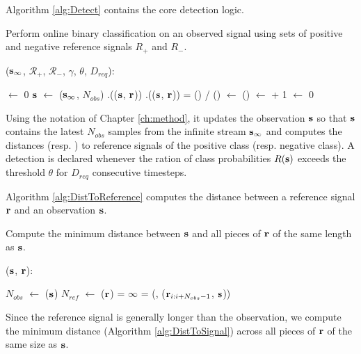 Algorithm \ref{alg:Detect} contains the core detection logic. 
\begin{algorithm}
\caption{Perform online binary classification on an observed signal
    using sets of positive and negative reference signals $R_+$ and $R_-$.}
\label{alg:Detect}
($\mathbf s_{\infty}$, $\mathcal{R}_+$, $\mathcal{R}_-$, $\gamma$, $\theta$,
$D_{req}$):
\begin{algorithmic}[1]
\STATE {} $\leftarrow$ 0
\LOOP
  \STATE $\mathbf s$ $\leftarrow$ ($\mathbf s_{\infty}$, $N_{obs}$)
    \STATE {}.(($\mathbf s$, $\mathbf r$))
  \ENDFOR
    \STATE {}.(($\mathbf s$, $\mathbf r$))
  \ENDFOR
  \STATE {} = () / ()
      \STATE {} $\leftarrow$ ()
      \RETURN {}
    \ELSE
      \STATE {} $\leftarrow$  + 1
    \ENDIF
  \ELSE
    \STATE {} $\leftarrow$ 0
  \ENDIF
\ENDLOOP
\end{algorithmic}
\end{algorithm}
Using the notation of Chapter \ref{ch:method}, it updates the observation $\mathbf
s$ so that $\mathbf s$ contains the latest $N_{obs}$ samples from the infinite
stream $\mathbf s_{\infty}$ and computes the distances 
(resp. ) to reference signals of the positive class (resp. negative
class). A detection is declared whenever the ration of class probabilities
$R(\mathbf s)$ exceeds the threshold $\theta$ for $D_{req}$ consecutive timesteps.

Algorithm \ref{alg:DistToReference} computes the distance between a reference
signal $\mathbf r$ and an observation $\mathbf s$. 
\begin{algorithm}
\caption{Compute the minimum distance between $\mathbf s$ and all pieces of $\mathbf r$
  of the same length as $\mathbf s$.}
\label{alg:DistToReference}
($\mathbf s$, $\mathbf r$):
\begin{algorithmic}[1]
  \STATE $N_{obs}$ $\leftarrow$ ($\mathbf s$)
  \STATE $N_{ref}$ $\leftarrow$ ($\mathbf r$)
  \STATE {} = $\infty$
    \STATE {} = (, ($\mathbf r_{i:i+N_{obs}-1}$, $\mathbf s$))
  \ENDFOR
  \RETURN {}
\end{algorithmic}
\end{algorithm}
Since the reference signal is
generally longer than the observation, we compute the minimum distance
(Algorithm \ref{alg:DistToSignal}) across all pieces of $\mathbf r$ of the same size as $\mathbf
s$.

